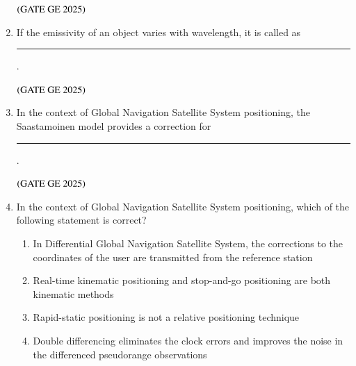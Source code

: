 \documentclass[journal,12pt,onecolumn]{IEEEtran}
\theoremstyle{remark}
\begin{document}
\begin{enumerate}
\begin{enumerate}
\end{enumerate}
\hfill $\left(\text{GATE GE 2025}\right)$
\bigskip
\item If the emissivity of an object varies with wavelength, it is called as \rule{2cm}{0.5mm}.
\begin{enumerate}
\end{enumerate}
\hfill $\left(\text{GATE GE 2025}\right)$
\bigskip
\item In the context of Global Navigation Satellite System positioning, the Saastamoinen model provides a correction for \rule{2cm}{0.5mm}.
\begin{enumerate}
\end{enumerate}
\hfill $\left(\text{GATE GE 2025}\right)$
\bigskip
\item In the context of Global Navigation Satellite System positioning, which of the following statement is correct?
\begin{enumerate}
\item In Differential Global Navigation Satellite System, the corrections to the coordinates of the user are transmitted from the reference station
\item Real-time kinematic positioning and stop-and-go positioning are both kinematic methods
\item Rapid-static positioning is not a relative positioning technique
\item Double differencing eliminates the clock errors and improves the noise in the differenced pseudorange observations

\end{enumerate}
\end{enumerate}
\end{document}
